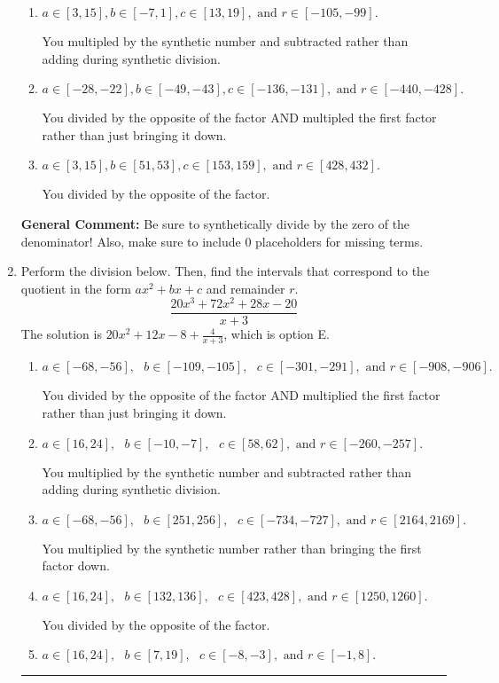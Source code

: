 \documentclass{extbook}[14pt]
\newcommand{\litem}[1]{\item #1

\rule{\textwidth}{0.4pt}}
\begin{document}
\begin{enumerate}
{\begin{enumerate}[label=\Alph*.]
 You multipled by the synthetic number rather than bringing the first factor down.
\item \( a \in [3, 15], b \in [-7, 1], c \in [13, 19], \text{ and } r \in [-105, -99]. \)

 You multipled by the synthetic number and subtracted rather than adding during synthetic division.
\item \( a \in [-28, -22], b \in [-49, -43], c \in [-136, -131], \text{ and } r \in [-440, -428]. \)

 You divided by the opposite of the factor AND multipled the first factor rather than just bringing it down.
\item \( a \in [3, 15], b \in [51, 53], c \in [153, 159], \text{ and } r \in [428, 432]. \)

 You divided by the opposite of the factor.
\end{enumerate}

\textbf{General Comment:} Be sure to synthetically divide by the zero of the denominator! Also, make sure to include 0 placeholders for missing terms.
}
\litem{
Perform the division below. Then, find the intervals that correspond to the quotient in the form $ax^2+bx+c$ and remainder $r$.
\[ \frac{20x^{3} +72 x^{2} +28 x -20}{x + 3} \]The solution is \( 20x^{2} +12 x -8 + \frac{4}{x + 3} \), which is option E.\begin{enumerate}[label=\Alph*.]
\item \( a \in [-68, -56], \text{   } b \in [-109, -105], \text{   } c \in [-301, -291], \text{   and   } r \in [-908, -906]. \)

 You divided by the opposite of the factor AND multiplied the first factor rather than just bringing it down.
\item \( a \in [16, 24], \text{   } b \in [-10, -7], \text{   } c \in [58, 62], \text{   and   } r \in [-260, -257]. \)

 You multiplied by the synthetic number and subtracted rather than adding during synthetic division.
\item \( a \in [-68, -56], \text{   } b \in [251, 256], \text{   } c \in [-734, -727], \text{   and   } r \in [2164, 2169]. \)

 You multiplied by the synthetic number rather than bringing the first factor down.
\item \( a \in [16, 24], \text{   } b \in [132, 136], \text{   } c \in [423, 428], \text{   and   } r \in [1250, 1260]. \)

 You divided by the opposite of the factor.
\item \( a \in [16, 24], \text{   } b \in [7, 19], \text{   } c \in [-8, -3], \text{   and   } r \in [-1, 8]. \)


\end{enumerate}}
\end{enumerate}
\end{document}
